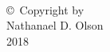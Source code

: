 
\thispagestyle{empty}
\hbox{\ }

\vfill
\renewcommand{\baselinestretch}{1}
\small\normalsize

\vspace{-.65in}

\begin{center}
\large{\copyright \hbox{ }Copyright by\\
Nathanael D. Olson  %
\\
2018}
\end{center}

\vfill

\newpage

\hbox{\ }
\newpage
